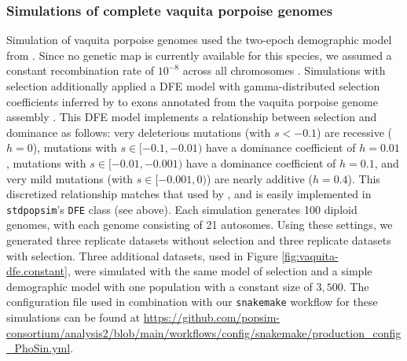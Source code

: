 \documentclass[hidelinks]{article}
\newcommand{\stdpopsim}{\texttt{stdpopsim}\xspace}
\newcommand{\snakemake}{\texttt{snakemake}\xspace}
\begin{document}
    \subsubsection*{Simulations of complete vaquita porpoise genomes}
    Simulation of vaquita porpoise genomes used
    the two-epoch demographic model from \citet[\stdpopsim label \texttt{Vaquita2Epoch\_1R22}]{robinson2022critically}.
    Since no genetic map is currently available for this species, we assumed a constant recombination rate of $10^{-8}$
    across all chromosomes \citep{morin2021}.
    Simulations with selection additionally applied a DFE model with gamma-distributed selection coefficients inferred by
    \citet[\stdpopsim label \texttt{Gamma\_R22}]{robinson2022critically} to exons annotated from the vaquita porpoise genome assembly
    \citet[\stdpopsim label \texttt{Phocoena\_sinus.mPhoSin1.pri.110\_exons}]{morin2021}.
    This DFE model implements a relationship between selection and dominance as follows:
    very deleterious mutations (with $s<-0.1$) are recessive ($h=0$),
    mutations with $s\in [-0.1,-0.01)$ have a dominance coefficient of $h=0.01$,
    mutations with $s\in [-0.01,-0.001)$ have a dominance coefficient of $h=0.1$,
    and very mild mutations (with $s\in [-0.001,0)$) are nearly additive ($h=0.4$).
    This discretized relationship matches that used by \textcite{robinson2022critically},
    and is easily implemented in \stdpopsim's \texttt{DFE} class (see above). %
    Each simulation generates 100 diploid genomes,
    with each genome consisting of 21 autosomes.
    Using these settings, we generated three replicate datasets without selection
    and three replicate datasets with selection.
    Three additional datasets, used in Figure \ref{fig:vaquita-dfe.constant},
    were simulated with the same model of selection and a simple demographic model with one population with a constant size of $3,500$.
    The configuration file used in combination with our \snakemake workflow
    for these simulations can be found at
    \url{https://github.com/popsim-consortium/analysis2/blob/main/workflows/config/snakemake/production_config_PhoSin.yml}.
\end{document}
